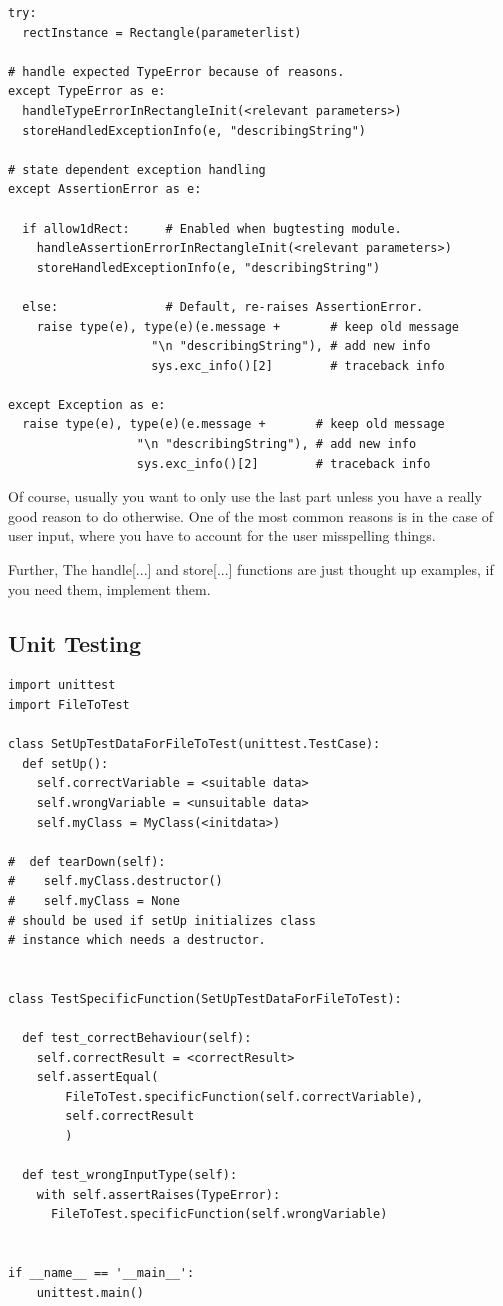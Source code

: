 \documentclass[10pt,a4paper]{article}
\begin{document}
\begin{lstlisting}
try: 
  rectInstance = Rectangle(parameterlist)

# handle expected TypeError because of reasons.
except TypeError as e:  
  handleTypeErrorInRectangleInit(<relevant parameters>)
  storeHandledExceptionInfo(e, "describingString")
  
# state dependent exception handling
except AssertionError as e: 

  if allow1dRect:     # Enabled when bugtesting module. 
    handleAssertionErrorInRectangleInit(<relevant parameters>)
    storeHandledExceptionInfo(e, "describingString")

  else:               # Default, re-raises AssertionError.
    raise type(e), type(e)(e.message +       # keep old message
                    "\n "describingString"), # add new info
                    sys.exc_info()[2]        # traceback info
  
except Exception as e: 
  raise type(e), type(e)(e.message +       # keep old message
                  "\n "describingString"), # add new info
                  sys.exc_info()[2]        # traceback info
\end{lstlisting}
Of course, usually you want to only use the last part unless you have a really good reason to do otherwise. One of the most common reasons is in the case of user input, where you have to account for the user misspelling things.

Further, The handle[...] and store[...] functions are just thought up examples, if you need them, implement them.

\newpage
\subsection{Unit Testing}

\begin{lstlisting}
import unittest
import FileToTest 

class SetUpTestDataForFileToTest(unittest.TestCase):
  def setUp():
    self.correctVariable = <suitable data>
    self.wrongVariable = <unsuitable data>
    self.myClass = MyClass(<initdata>) 
    
#  def tearDown(self):  
#    self.myClass.destructor()  
#    self.myClass = None
# should be used if setUp initializes class  
# instance which needs a destructor.


class TestSpecificFunction(SetUpTestDataForFileToTest):

  def test_correctBehaviour(self):
    self.correctResult = <correctResult>
    self.assertEqual(
        FileToTest.specificFunction(self.correctVariable), 
        self.correctResult
        )

  def test_wrongInputType(self):
    with self.assertRaises(TypeError):
      FileToTest.specificFunction(self.wrongVariable)


if __name__ == '__main__':
    unittest.main()

\end{lstlisting}
\end{document}
